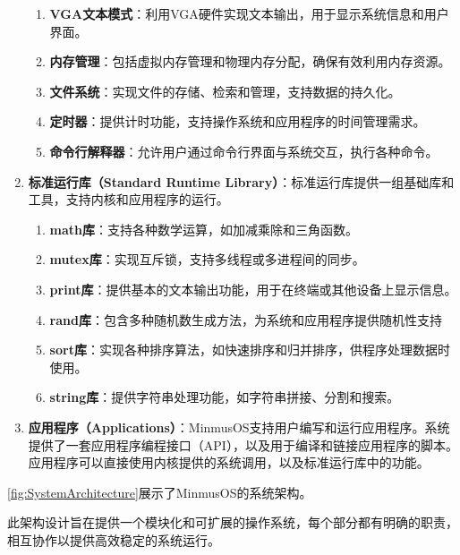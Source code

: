 \begin{enumerate}
\begin{enumerate}
              \item \textbf{VGA文本模式}：利用VGA硬件实现文本输出，用于显示系统信息和用户界面。
              \item \textbf{内存管理}：包括虚拟内存管理和物理内存分配，确保有效利用内存资源。
              \item \textbf{文件系统}：实现文件的存储、检索和管理，支持数据的持久化。
              \item \textbf{定时器}：提供计时功能，支持操作系统和应用程序的时间管理需求。
              \item \textbf{命令行解释器}：允许用户通过命令行界面与系统交互，执行各种命令。
          \end{enumerate}
    \item \textbf{标准运行库（Standard Runtime Library）}：标准运行库提供一组基础库和工具，支持内核和应用程序的运行。
          \begin{enumerate}
              \item \textbf{math库}：支持各种数学运算，如加减乘除和三角函数。
              \item \textbf{mutex库}：实现互斥锁，支持多线程或多进程间的同步。
              \item \textbf{print库}：提供基本的文本输出功能，用于在终端或其他设备上显示信息。
              \item \textbf{rand库}：包含多种随机数生成方法，为系统和应用程序提供随机性支持
              \item \textbf{sort库}：实现各种排序算法，如快速排序和归并排序，供程序处理数据时使用。
              \item \textbf{string库}：提供字符串处理功能，如字符串拼接、分割和搜索。
          \end{enumerate}
    \item \textbf{应用程序（Applications）}：MinmusOS支持用户编写和运行应用程序。系统提供了一套应用程序编程接口（API），以及用于编译和链接应用程序的脚本。应用程序可以直接使用内核提供的系统调用，以及标准运行库中的功能。
\end{enumerate}

\cref{fig:SystemArchitecture}展示了MinmusOS的系统架构。

此架构设计旨在提供一个模块化和可扩展的操作系统，每个部分都有明确的职责，相互协作以提供高效稳定的系统运行。

